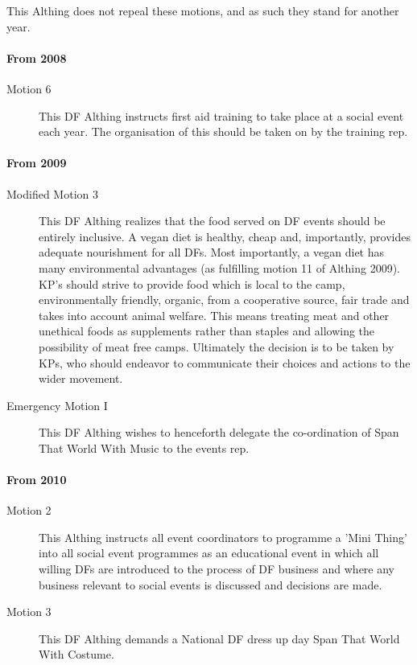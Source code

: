 \documentclass[a4paper, 11pt]{article} %
\begin{document}
This Althing does not repeal these motions, and as such they stand for another year.

\paragraph{From 2008}

\begin{description}
\item[Motion 6]  This DF Althing instructs first aid training to take place at a social event each year. The organisation of this should be taken on by the training rep.
\end{description}

\paragraph{From 2009}
\begin{description}
\item[Modified Motion 3]  This DF Althing realizes that the food served on DF events should be entirely inclusive. A vegan diet is healthy, cheap and, importantly, provides adequate nourishment for all DFs. Most importantly, a vegan diet has many environmental advantages (as fulfilling motion 11 of Althing 2009). KP’s should strive to provide food which is local to the camp, environmentally friendly, organic, from a cooperative source, fair trade and takes into account animal welfare. This means treating meat and other unethical foods as supplements rather than staples and allowing the possibility of meat free camps. Ultimately the decision is to be taken by KPs, who should endeavor to communicate their choices and actions to the wider movement.

\item[Emergency Motion I]  This DF Althing wishes to henceforth delegate the co-ordination of Span That World With Music to the events rep.
\end{description}

\paragraph{From 2010}
\begin{description}
\item[Motion 2]  This Althing instructs all event coordinators to programme a 'Mini Thing' into all social event
programmes as an educational event in which all willing DFs are introduced to the process of DF
business and where any business relevant to social events is discussed and decisions are made.

\item[Motion 3]  This DF Althing demands a National DF dress up day Span That World With Costume.
\end{description}
\end{document}
